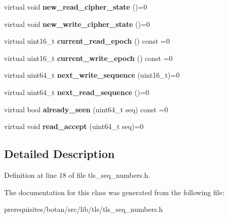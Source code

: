 \begin{DoxyCompactItemize}
\item 
\mbox{\label{class_botan_1_1_t_l_s_1_1_connection___sequence___numbers_ac89de2fd84c6f7efebc7562978e85898}} 
virtual void {\bfseries new\+\_\+read\+\_\+cipher\+\_\+state} ()=0
\item 
\mbox{\label{class_botan_1_1_t_l_s_1_1_connection___sequence___numbers_ada28c58a12f2acc61f948b63f76824d3}} 
virtual void {\bfseries new\+\_\+write\+\_\+cipher\+\_\+state} ()=0
\item 
\mbox{\label{class_botan_1_1_t_l_s_1_1_connection___sequence___numbers_a28e4324bc932b9522d4454c73c6e597e}} 
virtual uint16\+\_\+t {\bfseries current\+\_\+read\+\_\+epoch} () const =0
\item 
\mbox{\label{class_botan_1_1_t_l_s_1_1_connection___sequence___numbers_a7c0dfaa703ba1ddd8b37d6d75d3cafac}} 
virtual uint16\+\_\+t {\bfseries current\+\_\+write\+\_\+epoch} () const =0
\item 
\mbox{\label{class_botan_1_1_t_l_s_1_1_connection___sequence___numbers_aed3101a3e91efeb1d4ff9666afd56d4e}} 
virtual uint64\+\_\+t {\bfseries next\+\_\+write\+\_\+sequence} (uint16\+\_\+t)=0
\item 
\mbox{\label{class_botan_1_1_t_l_s_1_1_connection___sequence___numbers_a3a8b708ad1cf8cfb3feb8ee6ed8f69d5}} 
virtual uint64\+\_\+t {\bfseries next\+\_\+read\+\_\+sequence} ()=0
\item 
\mbox{\label{class_botan_1_1_t_l_s_1_1_connection___sequence___numbers_acc2f8b12875551869c52261771b39836}} 
virtual bool {\bfseries already\+\_\+seen} (uint64\+\_\+t seq) const =0
\item 
\mbox{\label{class_botan_1_1_t_l_s_1_1_connection___sequence___numbers_a489a5fddd48ae5f52fc0e2b4b7ba41ee}} 
virtual void {\bfseries read\+\_\+accept} (uint64\+\_\+t seq)=0
\end{DoxyCompactItemize}


\subsection{Detailed Description}


Definition at line 18 of file tls\+\_\+seq\+\_\+numbers.\+h.



The documentation for this class was generated from the following file\+:\begin{DoxyCompactItemize}
\item 
prerequisites/botan/src/lib/tls/tls\+\_\+seq\+\_\+numbers.\+h\end{DoxyCompactItemize}
